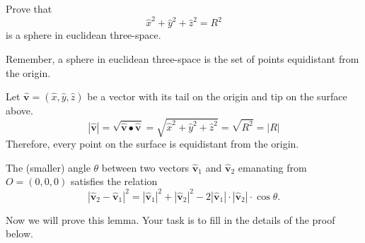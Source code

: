 \documentclass[newpage,hints,handout,nooutcomes,noauthor,12pt]{ximera}
\begin{document}
\begin{problem}
  Prove that
  \[
  \hat{x}^2 + \hat{y}^2 + \hat{z}^2 = R^2
  \]
  is a sphere in euclidean three-space.
  
\begin{hint}
  Remember, a sphere in euclidean three-space is the set of points equidistant
  from the origin.
\end{hint}

\begin{freeResponse}
Let $\hat{\mathbf v}= \left(\hat{x},\hat{y}, \hat{z}\right)$ be a vector with its tail on the origin and tip on the surface above.
\[
\left\vert \hat{\mathbf v}\right\vert = \sqrt{\hat{\mathbf v}\bullet \hat{\mathbf v}} = \sqrt{ \hat{x}^2+\hat{y}^2 + \hat{z}^2}= \sqrt{R^2} = \left\vert R \right\vert
\] 
Therefore, every point on the surface is equidistant from the origin.
\end{freeResponse}  
\end{problem}


\begin{lemma}
\label{110} The (smaller) angle $\theta$ between two
vectors $\hat{\mathbf v}_{1}$ and $\hat{\mathbf v}_{2}$ emanating from
$O=\left(0,0,0\right)$ satisfies the relation%
\[
\left\lvert \hat{\mathbf v}_{2}-\hat{\mathbf v}_{1}\right\rvert ^{2}
=\left\lvert \hat{\mathbf v}_{1}\right\rvert^{2}
+\left\lvert \hat{\mathbf v}_{2}\right\rvert^{2}
-2\left\lvert\hat{\mathbf v}_{1}\right\rvert \cdot
\left\lvert \hat{\mathbf v}_{2}\right\rvert \cdot \cos\theta.
\]
\end{lemma}

Now we will prove this lemma. Your task is to fill in the details of
the proof below.
\end{document}
